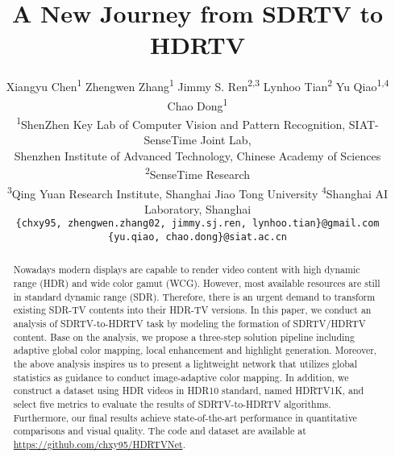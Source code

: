 \documentclass[10pt,twocolumn,letterpaper]{article}
\begin{document}
\title{A New Journey from SDRTV to HDRTV}

\author{
 Xiangyu Chen\textsuperscript{\rm 1\rm *} \space \space 
 Zhengwen Zhang\textsuperscript{\rm 1\rm *} \space \space
Jimmy S. Ren\textsuperscript{\rm 2,3} \space \space
 Lynhoo Tian\textsuperscript{\rm 2} \space \space
 Yu Qiao\textsuperscript{\rm 1,4}   \space \space 
 Chao Dong\textsuperscript{\rm 1\dag}\\
\textsuperscript{\rm 1}ShenZhen Key Lab of Computer Vision and Pattern Recognition, SIAT-SenseTime Joint Lab,\\Shenzhen Institute of Advanced Technology, Chinese Academy of Sciences
 \textsuperscript{\rm 2}SenseTime Research\\ 
 \textsuperscript{\rm 3}Qing Yuan Research Institute, Shanghai Jiao Tong University \space \space
 \textsuperscript{\rm 4}Shanghai AI Laboratory, Shanghai\\
 {\tt\small\{chxy95, zhengwen.zhang02, jimmy.sj.ren, lynhoo.tian\}@gmail.com}\space \space
 {\tt\small\{yu.qiao, chao.dong\}@siat.ac.cn} 
}

\maketitle
\ificcvfinal\thispagestyle{empty}\fi

\renewcommand{\thefootnote}{\fnsymbol{footnote}}
\renewcommand{\thefootnote}{1}

\begin{abstract}
Nowadays modern displays are capable to render video content with high dynamic range (HDR) and wide color gamut (WCG). However, most available resources are still in standard dynamic range (SDR). Therefore, there is an urgent demand to transform existing SDR-TV contents into their HDR-TV versions. In this paper, we conduct an analysis of SDRTV-to-HDRTV task by modeling the formation of SDRTV/HDRTV content. Base on the analysis, we propose a three-step solution pipeline including adaptive global color mapping, local enhancement and highlight generation. Moreover, the above analysis inspires us to present a lightweight network that utilizes global statistics as guidance to conduct image-adaptive color mapping. In addition, we construct a dataset using HDR videos in HDR10 standard, named HDRTV1K, and select five metrics to evaluate the results of SDRTV-to-HDRTV algorithms. Furthermore, our final results achieve state-of-the-art performance in quantitative comparisons and visual quality. The code and dataset are available at \url{https://github.com/chxy95/HDRTVNet}.

\end{abstract}
\end{document}
